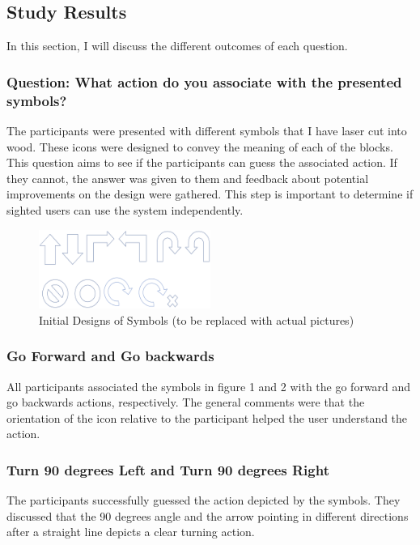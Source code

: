 \documentclass[oneside,%
                    author={Malak Hajji},
                    degree={BSc},
                    title={Designing An Accessible Computational Toolkit For Students},
                  subtitle={With Mixed Visual Abilities}]{dissertation}
\begin{document}
\subsection{Study Results}
In this section, I will discuss the different outcomes of each question.

\subsubsection{Question: What action do you associate with the presented symbols?}
The participants were presented with different symbols that I have laser cut into wood. These icons were designed to convey the meaning of each of the blocks. This question aims to see if the participants can guess the associated action. If they cannot, the answer was given to them and feedback about potential improvements on the design were gathered. This step is important to determine if sighted users can use the system independently.
\FloatBarrier
\begin{figure}[h]
    \centering
    \includegraphics[width=0.5\textwidth]{thesis/design.eps}
    \caption{Initial Designs of Symbols (to be replaced with actual pictures)}
    \label{fig-design-initial}
\end{figure}
\FloatBarrier
\subsubsection{Go Forward and Go backwards}
All participants associated the symbols in figure 1 and 2 with the go forward and go backwards actions, respectively. The general comments were that the orientation of the icon relative to the participant helped the user understand the action. 

\subsubsection{Turn 90 degrees Left and Turn 90 degrees Right}
The participants successfully guessed the action depicted by the symbols. They discussed that the 90 degrees angle and the arrow pointing in different directions after a straight line depicts a clear turning action. 
\end{document}
